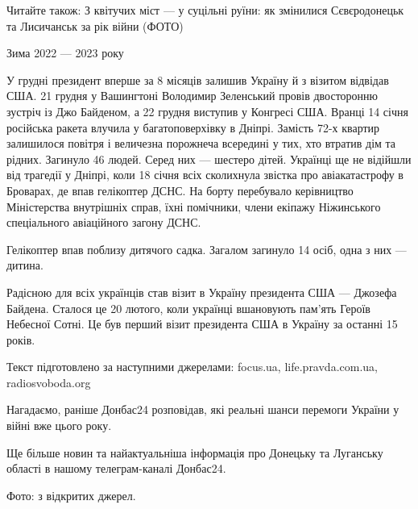 Читайте також: З квітучих міст — у суцільні руїни: як змінилися Сєвєродонецьк
та Лисичанськ за рік війни (ФОТО)

Зима 2022 — 2023 року

У грудні президент вперше за 8 місяців залишив Україну й з візитом відвідав
США. 21 грудня у Вашингтоні Володимир Зеленський провів двосторонню зустріч із
Джо Байденом, а 22 грудня виступив у Конгресі США. Вранці 14 січня російська
ракета влучила у багатоповерхівку в Дніпрі. Замість 72-х квартир залишилося
повітря і величезна порожнеча всередині у тих, хто втратив дім та рідних.
Загинуло 46 людей. Серед них — шестеро дітей. Українці ще не відійшли від
трагедії у Дніпрі, коли 18 січня всіх сколихнула звістка про авіакатастрофу в
Броварах, де впав гелікоптер ДСНС. На борту перебувало керівництво Міністерства
внутрішніх справ, їхні помічники, члени екіпажу Ніжинського спеціального
авіаційного загону ДСНС.

Гелікоптер впав поблизу дитячого садка. Загалом загинуло 14 осіб, одна з них —
дитина.

Радісною для всіх українців став візит в Україну президента США — Джозефа
Байдена. Сталося це 20 лютого, коли українці вшановують пам'ять Героїв Небесної
Сотні. Це був перший візит президента США в Україну за останні 15 років.

Текст підготовлено за наступними джерелами: focus.ua, life.pravda.com.ua,
radiosvoboda.org

Нагадаємо, раніше Донбас24 розповідав, які реальні шанси перемоги України у
війні вже цього року.

Ще більше новин та найактуальніша інформація про Донецьку та Луганську області
в нашому телеграм-каналі Донбас24.

Фото: з відкритих джерел.
